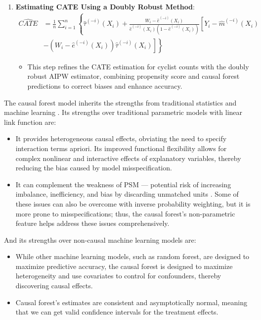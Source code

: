\documentclass[preprint,12pt, authoryear]{elsarticle}
\begin{document}
\begin{enumerate}
    \item \textbf{Estimating CATE Using a Doubly Robust Method}:
    \begin{equation}
    \begin{aligned}
    \widehat{C A T E} & =\frac{1}{n} \sum_{i=1}^n \left\{ \hat{\tau}^{(-i)}\left(X_i\right) + \frac{W_i-\hat{e}^{(-i)}\left(X_i\right)}{\hat{e}^{(-i)}\left(X_i\right)\left(1-\hat{e}^{(-i)}\left(X_i\right)\right)} \left[ Y_i-\hat{m}^{(-i)}\left(X_i\right) \right. \right. \\
    & \left. \left. -\left(W_i-\hat{e}^{(-i)}\left(X_i\right)\right) \hat{\tau}^{(-i)}\left(X_i\right) \right] \right\}
    \end{aligned}
    \end{equation}
    \begin{itemize}
        \item This step refines the CATE estimation for cyclist counts with the doubly robust AIPW estimator, combining propensity score and causal forest predictions to correct biases and enhance accuracy.
    \end{itemize}
\end{enumerate}


The causal forest model inherits the strengths from traditional statistics and machine learning \citep{athey_estimating_2019}. Its strengths over traditional parametric models with linear link function are:
\begin{itemize}
    \item It provides heterogeneous causal effects, obviating the need to specify interaction terms apriori. Its improved functional flexibility allows for complex nonlinear and interactive effects of explanatory variables, thereby reducing the bias caused by model misspecification.
    \item It can complement the weakness of PSM --- potential risk of increasing imbalance, inefficiency, and bias by discarding unmatched units \citep{ripollone_implications_2018, guo_propensity_2020}. Some of these issues can also be overcome with inverse probability weighting, but it is more prone to misspecifications; thus, the causal forest's non-parametric feature helps address these issues comprehensively. 
\end{itemize}
And its strengths over non-causal machine learning models are:
\begin{itemize}
    \item While other machine learning models, such as random forest, are designed to maximize predictive accuracy, the causal forest is designed to maximize heterogeneity and use covariates to control for confounders, thereby discovering causal effects.
    \item Causal forest's estimates are consistent and asymptotically normal, meaning that we can get valid confidence intervals for the treatment effects.
\end{itemize}
\end{document}
